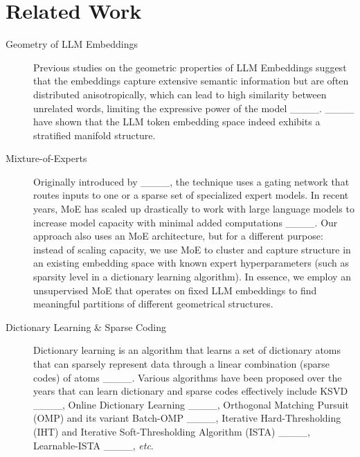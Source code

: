 \section{Related Work}
\begin{description}
    \item[Geometry of LLM Embeddings] Previous studies on the geometric properties of LLM Embeddings suggest that the embeddings capture extensive semantic information but are often distributed anisotropically, which can lead to high similarity between unrelated words, limiting the expressive power of the model ____. ____ have shown that the LLM token embedding space indeed exhibits a stratified manifold structure.
    \item[Mixture-of-Experts] Originally introduced by ____, the technique uses a gating network that routes inputs to one or a sparse set of specialized expert models. In recent years, MoE has scaled up drastically to work with large language models to increase model capacity with minimal added computations ____. Our approach also uses an MoE architecture, but for a different purpose: instead of scaling capacity, we use MoE to cluster and capture structure in an existing embedding space with known expert hyperparameters (such as sparsity level in a dictionary learning algorithm). In essence, we employ an unsupervised MoE that operates on fixed LLM embeddings to find meaningful partitions of different geometrical structures.
    \item[Dictionary Learning \& Sparse Coding] Dictionary learning is an algorithm that learns a set of dictionary atoms that can sparsely represent data through a linear combination (sparse codes) of atoms ____. Various algorithms have been proposed over the years that can learn dictionary and sparse codes effectively include KSVD ____, Online Dictionary Learning ____, Orthogonal Matching Pursuit (OMP) and its variant Batch-OMP ____, Iterative Hard-Thresholding (IHT) and Iterative Soft-Thresholding Algorithm (ISTA) ____, Learnable-ISTA ____, \textit{etc}.
\end{description}